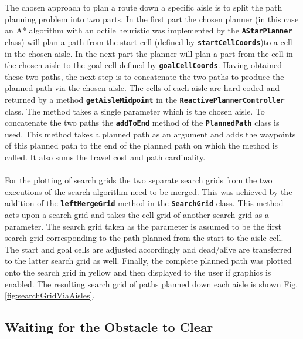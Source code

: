 \documentclass[a4paper,12pt]{article}
\begin{document}
			The chosen approach to plan a route down a specific aisle is to split the path planning problem into two parts. In the first part the chosen planner (in this case an A* algorithm with an octile heuristic was implemented by the \textbf{\texttt{AStarPlanner}} class) will plan a path from the start cell (defined by \textbf{\texttt{startCellCoords}})to a cell in the chosen aisle. In the next part the planner will plan a part from the cell in the chosen aisle to the goal cell defined by \textbf{\texttt{goalCellCoords}}. Having obtained these two paths, the next step is to concatenate the two paths to produce the planned path via the chosen aisle. The cells of each aisle are hard coded and returned by a method \textbf{\texttt{getAisleMidpoint}} in the \textbf{\texttt{ReactivePlannerController}} class. The method takes a single parameter which is the chosen aisle. To concatenate the two paths the \textbf{\texttt{addToEnd}} method of the \textbf{\texttt{PlannedPath}} class is used. This method takes a planned path as an argument and adds the waypoints of this planned path to the end of the planned path on which the method is called. It also sums the travel cost and path cardinality.
			\\
			\\
			For the plotting of search grids the two separate search grids from the two executions of the search algorithm need to be merged. This was achieved by the addition of the \textbf{\texttt{leftMergeGrid}} method in the \textbf{\texttt{SearchGrid}} class. This method acts upon a search grid and takes the cell grid of another search grid as a parameter. The search grid taken as the parameter is assumed to be the first search grid corresponding to the path planned from the start to the aisle cell. The start and goal cells are adjusted accordingly and dead/alive are transferred to the latter search grid as well. Finally, the complete planned path was plotted onto the search grid in yellow and then displayed to the user if graphics is enabled. The resulting search grid of paths planned down each aisle is shown Fig. \ref{fig:searchGridViaAisles}. 
		
		\subsection{Waiting for the Obstacle to Clear}
		\label{sec:waitingForTheObstacleToClearROS}
		
\end{document}
